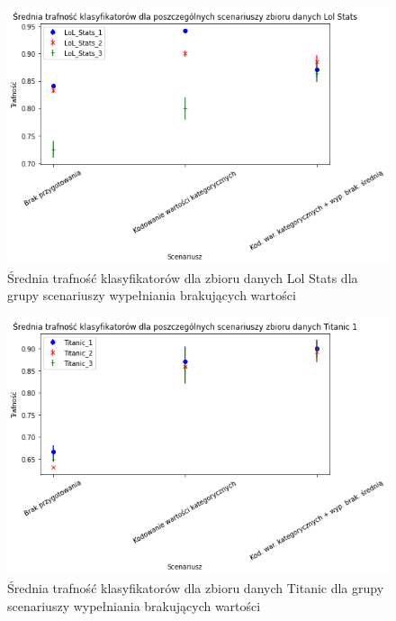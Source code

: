 \documentclass{book}
\begin{document}
\begin{figure}[H]
    \centerline{\includegraphics[scale=0.5]{Lol_Stats_Avg_Kodowanie}}
    \centering
    \caption{Średnia trafność klasyfikatorów dla zbioru danych Lol Stats 
    dla grupy scenariuszy wypełniania brakujących wartości}
    \end{figure}

\begin{figure}[H]
    \centerline{\includegraphics[scale=0.5]{Titanic_Avg_Kodowanie}}
    \centering
    \caption{Średnia trafność klasyfikatorów dla zbioru danych Titanic 
    dla grupy scenariuszy wypełniania brakujących wartości}
    \end{figure}
\end{document}

